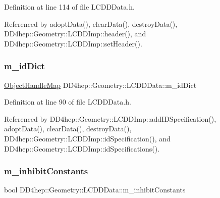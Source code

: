 Definition at line 114 of file L\+C\+D\+D\+Data.\+h.



Referenced by adopt\+Data(), clear\+Data(), destroy\+Data(), D\+D4hep\+::\+Geometry\+::\+L\+C\+D\+D\+Imp\+::header(), and D\+D4hep\+::\+Geometry\+::\+L\+C\+D\+D\+Imp\+::set\+Header().

\hypertarget{class_d_d4hep_1_1_geometry_1_1_l_c_d_d_data_acf98a251987f065777c7c1ae87c9a36b}{}\label{class_d_d4hep_1_1_geometry_1_1_l_c_d_d_data_acf98a251987f065777c7c1ae87c9a36b} 
\subsubsection{\texorpdfstring{m\+\_\+id\+Dict}{m\_idDict}}
{\footnotesize\ttfamily \hyperlink{class_d_d4hep_1_1_geometry_1_1_l_c_d_d_data_1_1_object_handle_map}{Object\+Handle\+Map} D\+D4hep\+::\+Geometry\+::\+L\+C\+D\+D\+Data\+::m\+\_\+id\+Dict\hspace{0.3cm}{\ttfamily [protected]}}



Definition at line 90 of file L\+C\+D\+D\+Data.\+h.



Referenced by D\+D4hep\+::\+Geometry\+::\+L\+C\+D\+D\+Imp\+::add\+I\+D\+Specification(), adopt\+Data(), clear\+Data(), destroy\+Data(), D\+D4hep\+::\+Geometry\+::\+L\+C\+D\+D\+Imp\+::id\+Specification(), and D\+D4hep\+::\+Geometry\+::\+L\+C\+D\+D\+Imp\+::id\+Specifications().

\hypertarget{class_d_d4hep_1_1_geometry_1_1_l_c_d_d_data_a81f222787e773b64fd9c8898f5e0aa9b}{}\label{class_d_d4hep_1_1_geometry_1_1_l_c_d_d_data_a81f222787e773b64fd9c8898f5e0aa9b} 
\subsubsection{\texorpdfstring{m\+\_\+inhibit\+Constants}{m\_inhibitConstants}}
{\footnotesize\ttfamily bool D\+D4hep\+::\+Geometry\+::\+L\+C\+D\+D\+Data\+::m\+\_\+inhibit\+Constants\hspace{0.3cm}{\ttfamily [protected]}}




